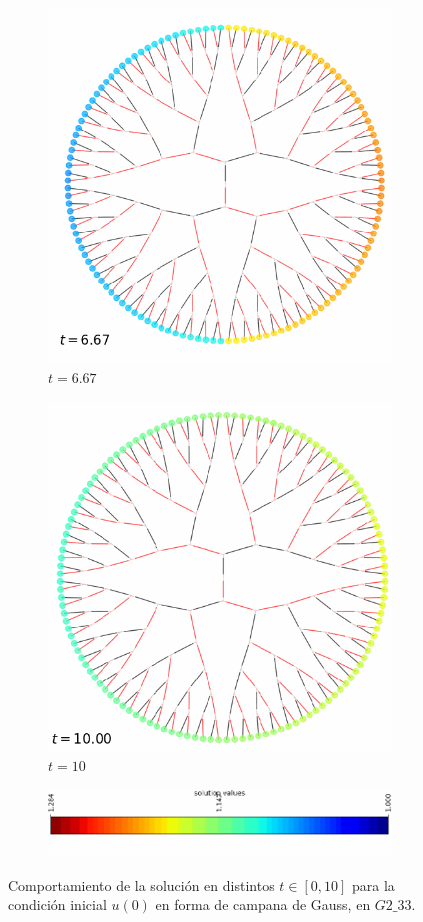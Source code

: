\begin{figure}
\begin{subfigure}{.5\textwidth}
		\centering
		\includegraphics[width=.8\linewidth]{img/solutions/normal_2}
		\caption{$t=6.67$}
		\label{fig:sfig1}
	\end{subfigure}%
	\begin{subfigure}{.5\textwidth}
		\centering
		\includegraphics[width=.8\linewidth]{img/solutions/normal_3}
		\caption{$t=10$}
		\label{fig:sfig1}
	\end{subfigure}
	\begin{subfigure}{1.05\textwidth}
		\centering
		\includegraphics[width=.8\linewidth]{img/solutions/normal_bar}
		\label{fig:sfig1}
	\end{subfigure}%
	\caption{Comportamiento de la solución en distintos $t\in[0,10]$ para la condición inicial $u(0)$ en forma de campana de Gauss, en $\mathit{G2\_33}$.}
	\label{IC-bell}
\end{figure}